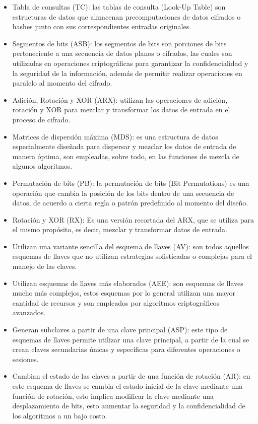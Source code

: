 \documentclass[a4paper,10pt]{article}
\begin{document}
	\begin{itemize}
		\item Tabla de consultas (TC): las tablas de consulta (Look-Up Table) son estructuras de datos que almacenan precomputaciones de datos cifrados o hashes junto con sus correspondientes entradas originales.
		\item Segmentos de bits (ASB): los segmentos de bits son porciones de bits perteneciente a una secuencia de datos planos o cifrados, las cuales son utilizadas en operaciones criptográficas para garantizar la confidencialidad y la seguridad de la información, además de permitir realizar operaciones en paralelo al momento del cifrado.
		\item Adición, Rotación y XOR (ARX): utilizan las operaciones de adición, rotación y XOR para mezclar y transformar los datos de entrada en el proceso de cifrado.
		\item Matrices de dispersión máxima (MDS): es una estructura de datos especialmente diseñada para dispersar y mezclar los datos de entrada de manera óptima, son empleadas, sobre todo, en las funciones de mezcla de algunos algoritmos.
		\item Permutación de bits (PB): la permutación de bits (Bit Permutations) es una operación que cambia la posición de los bits dentro de una secuencia de datos, de acuerdo a cierta regla o patrón predefinido al momento del diseño.
		\item Rotación y XOR (RX): Es una versión recortada del ARX, que se utiliza para el mismo propósito, es decir, mezclar y transformar datos de entrada.
		\item Utilizan una variante sencilla del esquema de llaves (AV): son todos aquellos esquemas de llaves que no utilizan estrategias sofisticadas o complejas para el manejo de las claves.
		\item Utilizan esquemas de llaves más elaborados (AEE): son esquemas de llaves mucho más complejos, estos esquemas por lo general utilizan una mayor cantidad de recursos y son empleados por algoritmos criptográficos avanzados.
		\item Generan subclaves a partir de una clave principal (ASP): este tipo de esquemas de llaves permite utilizar una clave principal, a partir de la cual se crean claves secundarias únicas y específicas para diferentes operaciones o sesiones.
		\item Cambian el estado de las claves a partir de una función de rotación (AR): en este esquema de llaves se cambia el estado inicial de la clave mediante una función de rotación, esto implica modificar la clave mediante una desplazamiento de bits, esto aumentar la seguridad y la confidencialidad de los algoritmos a un bajo costo.
	\end{itemize}
\end{document}
